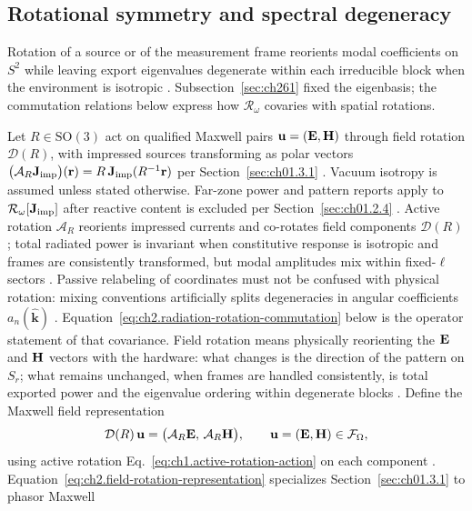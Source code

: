\subsection{Rotational symmetry and spectral degeneracy}
\label{sec:ch262}
Rotation of a source or of the measurement frame reorients modal coefficients on $S^2$ while
leaving export eigenvalues degenerate within each irreducible block when the environment is
isotropic \cite{harrington2001,stratton1941}. Subsection~\ref{sec:ch261} fixed the eigenbasis;
the commutation relations below express how $\mathcal{R}_\omega$ covaries with spatial
rotations.

Let $R\in\mathrm{SO}(3)$ act on qualified Maxwell pairs $\mathbf{u}=(\mathbf{E},\mathbf{H})$ through field
rotation $\mathcal{D}(R)$, with impressed sources transforming as polar vectors
$\big(\mathcal{A}_R\mathbf{J}_{\mathrm{imp}}\big)(\mathbf{r})=R\,\mathbf{J}_{\mathrm{imp}}(R^{-1}\mathbf{r})$ per
Section~\ref{sec:ch01.3.1} \cite{stratton1941}. Vacuum isotropy is assumed unless stated
otherwise. Far-zone power and pattern reports apply to $\mathcal{R}_\omega[\mathbf{J}_{\mathrm{imp}}]$ after
reactive content is excluded per Section~\ref{sec:ch01.2.4} \cite{harrington2001}.
Active rotation $\mathcal{A}_R$ reorients impressed currents and co-rotates field components
$\mathcal{D}(R)$; total radiated power is invariant when constitutive response is isotropic and
frames are consistently transformed, but modal amplitudes mix within fixed-$\ell$ sectors
\cite{harrington2001,collin2001,stratton1941}. Passive relabeling of coordinates must not be
confused with physical rotation: mixing conventions artificially splits degeneracies in angular
coefficients $a_n(\hat{\mathbf{k}})$ \cite{stratton1941}. Equation~\eqref{eq:ch2.radiation-rotation-commutation}
below is the operator statement of that covariance.
Field rotation means physically reorienting the $\mathbf{E}$ and $\mathbf{H}$ vectors with the hardware: what
changes is the direction of the pattern on $S_r$; what remains unchanged, when frames are
handled consistently, is total exported power and the eigenvalue ordering within degenerate
blocks \cite{harrington2001}. Define the Maxwell field representation
\begin{equation}
\label{eq:ch2.field-rotation-representation}
\mathcal{D}(R)\,\mathbf{u}
=
\big(\mathcal{A}_R\mathbf{E},\,\mathcal{A}_R\mathbf{H}\big),
\qquad
\mathbf{u}=(\mathbf{E},\mathbf{H})\in\mathcal{F}_\Omega,
\end{equation}
using active rotation Eq.~\eqref{eq:ch1.active-rotation-action} on each component
\cite{stratton1941}. Equation~\eqref{eq:ch2.field-rotation-representation} specializes
Section~\ref{sec:ch01.3.1} to phasor Maxwell

